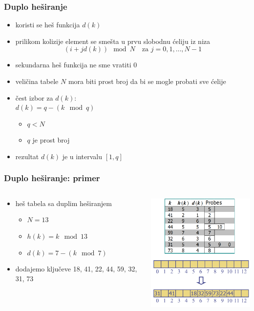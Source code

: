 \documentclass[compress]{beamer}
\begin{document}
\begin{frame}[fragile]
  \frametitle{Duplo heširanje}
  \begin{itemize}
    \item koristi se  heš funkcija $d(k)$
    \item prilikom kolizije element se smešta u prvu slobodnu ćeliju iz niza
    $$(i + jd(k))\mod N \quad\text{za}\,\, j = 0, 1, \ldots, N-1$$
    \item sekundarna heš funkcija ne sme vratiti 0
    \item veličina tabele $N$ mora biti prost broj da bi se mogle probati sve ćelije
    \item čest izbor za $d(k)$: \\
    $d(k) = q - (k\mod q)$
    \begin{itemize}
      \item $q < N$
      \item $q$ je prost broj
    \end{itemize}
    \item rezultat $d(k)$ je u intervalu $[1, q]$ 
  \end{itemize}
\end{frame}

\begin{frame}[fragile]
  \frametitle{Duplo heširanje: primer}
  \begin{columns}
    \begin{column}[c]{6cm}
      \begin{itemize}
        \item heš tabela sa duplim heširanjem
        \begin{itemize}
          \item $N = 13$
          \item $h(k) = k \mod 13$
          \item $d(k) = 7 - (k\mod 7)$
        \end{itemize}
        \item dodajemo ključeve 18, 41, 22, 44, 59, 32, 31, 73 
      \end{itemize}
    \end{column}
    \begin{column}[c]{6cm}
      \begin{center}
        \includegraphics[width=6cm]{asp-10-pic10.png}
      \end{center}
    \end{column}
  \end{columns}
\end{frame}
\end{document}
